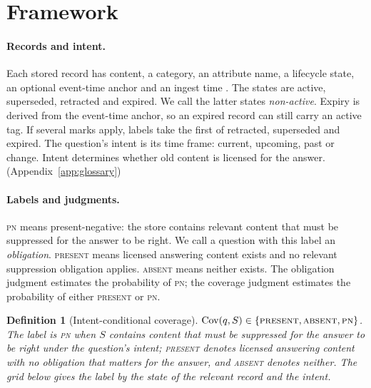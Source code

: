 \documentclass{article}
\newtheorem{definition}{Definition}
\newcommand{\present}{\textsc{present}}
\newcommand{\absent}{\textsc{absent}}
\newcommand{\pn}{\textsc{pn}}
\begin{document}
\section{Framework}\label{sec:framework}
\paragraph{Records and intent.}
Each stored record has content, a category, an attribute name, a lifecycle state, an optional event-time anchor and an ingest time \citep{fr}. The states are active, superseded, retracted and expired. We call the latter states \emph{non-active}. Expiry is derived from the event-time anchor, so an expired record can still carry an active tag. If several marks apply, labels take the first of retracted, superseded and expired. The question's intent is its time frame: current, upcoming, past or change. Intent determines whether old content is licensed for the answer. (Appendix~\ref{app:glossary})

\paragraph{Labels and judgments.}
\pn{} means present-negative: the store contains relevant content that must be suppressed for the answer to be right. We call a question with this label an \emph{obligation}. \present{} means licensed answering content exists and no relevant suppression obligation applies. \absent{} means neither exists. The obligation judgment estimates the probability of \pn{}; the coverage judgment estimates the probability of either \present{} or \pn{}.

\begin{definition}[Intent-conditional coverage]\label{def:coverage}
$\mathrm{Cov}(q,S)\in\{\present,\absent,\pn\}$.
The label is \pn{} when $S$ contains content that must be suppressed for the answer to be right under the question's intent; \present{} denotes licensed answering content with no obligation that matters for the answer, and \absent{} denotes neither. The grid below gives the label by the state of the relevant record and the intent.
\end{definition}
\end{document}
